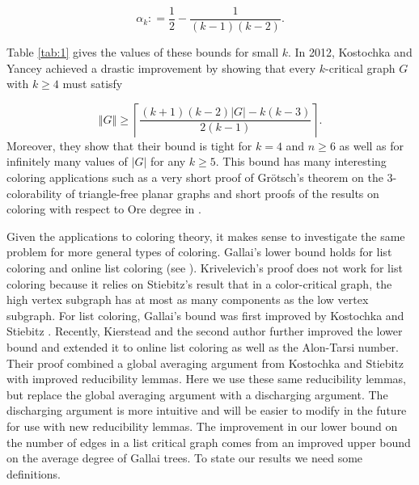 \documentclass[12pt]{article}
\theoremstyle{plain}
\theoremstyle{definition}
\theoremstyle{remark}
\newcommand{\card}[1]{\left|#1\right|}
\newcommand{\size}[1]{\left\Vert#1\right\Vert}
\newcommand{\ceil}[1]{\left\lceil#1\right\rceil}
\newcommand{\DefinedAs}{\mathrel{\mathop:}=}
\begin{document}
\[\alpha_k \DefinedAs \frac12 - \frac{1}{(k-1)(k-2)}.\]

Table \ref{tab:1} gives the values of these bounds for small $k$.  In 2012, Kostochka and Yancey \cite{kostochkayancey2012ore} achieved a drastic improvement by showing that every $k$-critical graph $G$ with $k \ge 4$ must satisfy

\[\size{G} \ge \ceil{\frac{(k+1)(k-2)\card{G} - k(k-3)}{2(k-1)}}.\]
Moreover, they show that their bound is tight for $k=4$ and $n \ge 6$ as well as for infinitely many values of $\card{G}$ for any $k \ge 5$.  This bound has many interesting coloring applications such as a very short proof of Gr\"otsch's theorem on the $3$-colorability of triangle-free planar graphs \cite{kostochka2012oregrotsch} and short proofs of the results on coloring with respect to Ore degree in \cite{kierstead2009ore, rabern2010a, krs_one}. 

Given the applications to coloring theory, it makes sense to investigate the same problem for more general types of coloring.  Gallai's lower bound \cite{gallai1963kritische} holds for list coloring and online list coloring (see \cite{kostochkastiebitzedgesincriticalgraph, riasat2012critically}).  Krivelevich's proof \cite{krivelevich1997minimal} does not work for list coloring because it relies on Stiebitz's result \cite{stiebitz1982proof} that in a color-critical graph, the high vertex subgraph has at most as many components as the low vertex subgraph. For list coloring, Gallai's bound was first improved by Kostochka and Stiebitz \cite{kostochkastiebitzedgesincriticalgraph}.  Recently, Kierstead and the second author \cite{OreVizing} further improved the lower bound and extended it to online list coloring as well as the Alon-Tarsi number.  Their proof combined a global averaging argument from Kostochka and Stiebitz \cite{kostochkastiebitzedgesincriticalgraph} with improved reducibility lemmas.  Here we use these same reducibility lemmas, but replace the global averaging argument with a discharging argument.  The discharging argument is more intuitive and will be easier to modify in the future for use with new reducibility lemmas.  The improvement in our lower bound on the number of edges in a list critical graph comes from an improved upper bound on the average degree of Gallai trees.  To state our results we need some definitions.
\end{document}
